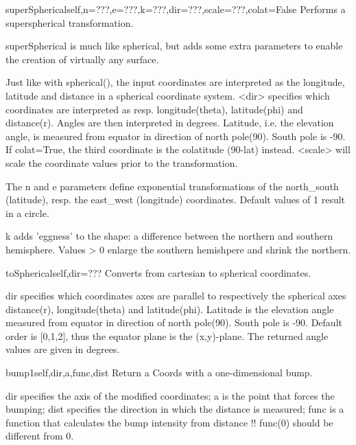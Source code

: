\begin{funcdesc}{superSpherical}{self,n=???,e=???,k=???,dir=???,scale=???,colat=False}
Performs a superspherical transformation.

        superSpherical is much like spherical, but adds some extra
        parameters to enable the creation of virtually any surface.

        Just like with spherical(), the input coordinates are interpreted as
        the longitude, latitude and distance in a spherical coordinate system.
        <dir> specifies which coordinates are interpreted as resp.
        longitude(theta), latitude(phi) and distance(r).
        Angles are then interpreted in degrees.
        Latitude, i.e. the elevation angle, is measured from equator in
        direction of north pole(90). South pole is -90.
        If colat=True, the third coordinate is the colatitude (90-lat) instead.
        <scale> will scale the coordinate values prior to the transformation.

        The n and e parameters define exponential transformations of the
        north_south (latitude), resp. the east_west (longitude) coordinates.
        Default values of 1 result in a circle.

        k adds 'eggness' to the shape: a difference between the northern and
        southern hemisphere. Values > 0 enlarge the southern hemishpere and
        shrink the northern.
        
\end{funcdesc}

\begin{funcdesc}{toSpherical}{self,dir=???}
Converts from cartesian to spherical coordinates.

        dir specifies which coordinates axes are parallel to respectively
        the spherical axes distance(r), longitude(theta) and latitude(phi).
        Latitude is the elevation angle measured from equator in direction
        of north pole(90). South pole is -90.
        Default order is [0,1,2], thus the equator plane is the (x,y)-plane.
        The returned angle values are given in degrees.
        
\end{funcdesc}

\begin{funcdesc}{bump1}{self,dir,a,func,dist}
Return a Coords with a one-dimensional bump.

        dir specifies the axis of the modified coordinates;
        a is the point that forces the bumping;
        dist specifies the direction in which the distance is measured;
        func is a function that calculates the bump intensity from distance
        !! func(0) should be different from 0.
        
\end{funcdesc}


